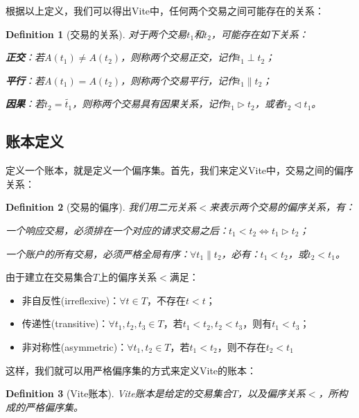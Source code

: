 \documentclass[UTF8,nofonts]{ctexart}
\newtheorem{definition}{Definition}[section]
\begin{document}
\begin{multicols}{2}
根据以上定义，我们可以得出Vite中，任何两个交易之间可能存在的关系：
\begin{definition}[交易的关系]
对于两个交易$t_{1}$和$t_{2}$，可能存在如下关系：

\textbf{正交}：若$A(t_{1}) \neq A(t_{2})$，则称两个交易正交，记作$t_{1} \perp t_{2}$；

\textbf{平行}：若$A(t_{1}) = A(t_{2})$，则称两个交易平行，记作$t_{1} \parallel t_{2}$；

\textbf{因果}：若$t_{2} = \widetilde{t_{1}}$，则称两个交易具有因果关系，记作$t_{1} \rhd t_{2}$，或者$t_{2} \lhd t_{1}$。
\end{definition}

\subsection{账本定义}
定义一个账本，就是定义一个偏序集。首先，我们来定义Vite中，交易之间的偏序关系：
\begin{definition}[交易的偏序]
我们用二元关系$<$来表示两个交易的偏序关系，有：

一个响应交易，必须排在一个对应的请求交易之后：$t_{1} < t_{2} \Leftrightarrow t_{1} \rhd t_{2}$；

一个账户的所有交易，必须严格全局有序：$\forall t_{1} \parallel t_{2}$，必有：$t_{1} < t_{2}$，或$t_{2} < t_{1}$。
\end{definition}

由于建立在交易集合$T$上的偏序关系$<$满足：
\begin{itemize}
	\item 非自反性(irreflexive)：$\forall t \in T$，不存在$t < t$；
	\item 传递性(transitive)：$\forall t_{1},t_{2},t_{3} \in T$，若$t_{1}<t_{2},t_{2}<t_{3}$，则有$t_{1}<t_{3}$；
	\item 非对称性(asymmetric)：$\forall t_{1},t_{2} \in T$，若$t_{1}<t_{2}$，则不存在$t_{2}<t_{1}$
\end{itemize}

这样，我们就可以用严格偏序集的方式来定义Vite的账本：

\begin{definition}[Vite账本]
Vite账本是给定的交易集合$T$，以及偏序关系$<$，所构成的严格偏序集。
\end{definition}


\end{multicols}
\end{document}
